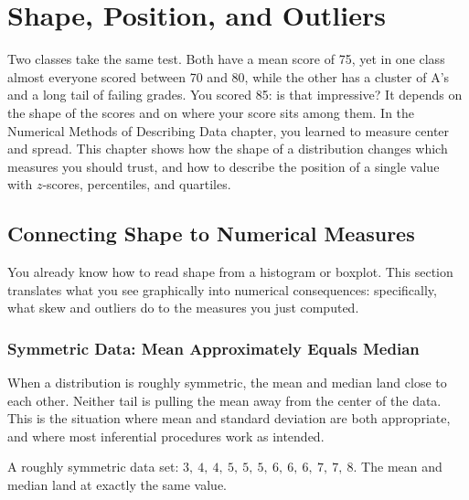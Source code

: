 \chapter{Shape, Position, and Outliers}

Two classes take the same test. Both have a mean score of 75, yet in one class almost everyone scored between
70 and 80, while the other has a cluster of A's and a long tail of failing grades. You scored 85: is that
impressive? It depends on the shape of the scores and on where your score sits among them. In the Numerical
Methods of Describing Data chapter, you learned to measure center and spread. This chapter shows how the
shape of a distribution changes which measures you should trust, and how to describe the position of a
single value with $z$-scores, percentiles, and quartiles.

\section{Connecting Shape to Numerical Measures}

You already know how to read shape from a histogram or boxplot. This
section translates what you see graphically into numerical consequences:
specifically, what skew and outliers do to the measures you just
computed.

\subsection{Symmetric Data: Mean Approximately Equals Median}

When a distribution is roughly symmetric, the mean and median land
close to each other. Neither tail is pulling the mean away from the
center of the data. This is the situation where mean and standard
deviation are both appropriate, and where most inferential procedures
work as intended.


\begin{center}

A roughly symmetric data set: $3,\ 4,\ 4,\ 5,\ 5,\ 5,\ 6,\ 6,\ 6,\ 7,\
7,\ 8$. The mean and median land at exactly the same value.
\end{center}

